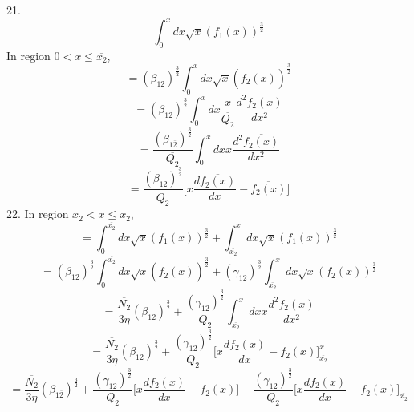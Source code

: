 \documentclass[fleqn, 10pt]{article}
\begin{document}
    21. 
        \begin{equation*}
            \int^{x}_0 dx \sqrt{x} (f_1(x))^\frac{3}{2}
        \end{equation*}
        In region $0<x\leq\overline{x_2}$, 
        \begin{equation*}
           = (\beta_{1\overline{2}})^\frac{3}{2} \int^{x}_0 dx \sqrt{x} (\overline{f_2(x)})^\frac{3}{2}
        \end{equation*}
        \begin{equation*}
            = (\beta_{1\overline{2}})^\frac{3}{2} \int^{x}_0 dx \frac{x}{\overline{Q_2}} \frac{d^2\overline{f_2(x)}}{dx^2} 
        \end{equation*}
        \begin{equation*}
            = \frac{(\beta_{1\overline{2}})^\frac{3}{2}}{\overline{Q_2}} \int^{x}_0 dx x \frac{d^2\overline{f_2(x)}}{dx^2} 
        \end{equation*}
        \begin{equation}
            = \frac{(\beta_{1\overline{2}})^\frac{3}{2}}{\overline{Q_2}} \biggl[ x\frac{d\overline{f_2(x)}}{dx} - \overline{f_2(x)}\biggr]
            \label{106}
        \end{equation}
        22. 
         In region $\overline{x_2}<x\leq x_2$,  
         \begin{equation*}
             = \int^{\overline{x_2}}_0 dx \sqrt{x} (f_1(x))^\frac{3}{2} + \int^{x}_{\overline{x_2}} dx \sqrt{x} (f_1(x))^\frac{3}{2}
         \end{equation*}
         \begin{equation*}
             = (\beta_{1\overline{2}})^\frac{3}{2} \int^{\overline{x_2}}_0 dx \sqrt{x} (\overline{f_2(x)})^\frac{3}{2} + (\gamma_{12})^\frac{3}{2} \int^{x}_{\overline{x_2}} dx \sqrt{x} (f_2(x))^\frac{3}{2} 
             \end{equation*}
             \begin{equation*}
                 = \frac{\overline{N_2}}{3 \eta} (\beta_{1\overline{2}})^\frac{3}{2} + \frac{(\gamma_{12})^\frac{3}{2}}{Q_2} \int^{x}_{\overline{x_2}} dx x \frac{d^2f_2(x)}{dx^2}
             \end{equation*}
             \begin{equation*}
                 = \frac{\overline{N_2}}{3 \eta} (\beta_{1\overline{2}})^\frac{3}{2} + \frac{(\gamma_{12})^\frac{3}{2}}{Q_2} \biggl[ x \frac{df_2(x)}{dx} - f_2(x) \biggr]^{x}_{\overline{x_2}} 
                \end{equation*}
                \begin{equation*}
                    = \frac{\overline{N_2}}{3 \eta} (\beta_{1\overline{2}})^\frac{3}{2} + \frac{(\gamma_{12})^\frac{3}{2}}{Q_2} \biggl[ x \frac{df_2(x)}{dx} - f_2(x) \biggr] - \frac{(\gamma_{12})^\frac{3}{2}}{Q_2} \biggl[ x \frac{df_2(x)}{dx} - f_2(x) \biggr]_{\overline{x_2}}
                \end{equation*}
\end{document}
